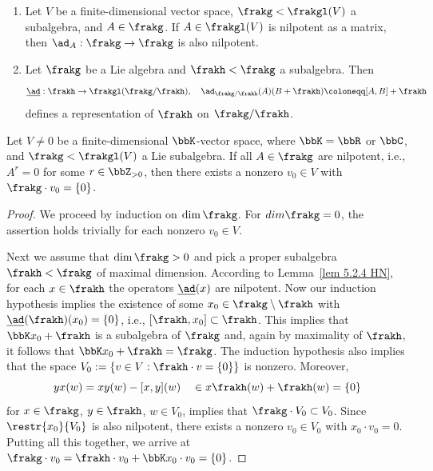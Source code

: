 \begin{lem}[{\cite[Lem.~5.2.4]{HN}}]\label{lem 5.2.4 HN}
    \begin{enumerate}[label=(\roman*)]
        \item Let $V$ be a finite-dimensional vector space, $\frakg<\frakgl(V)$ a subalgebra, and $A\in\frakg$. If $A\in\frakgl(V)$ is nilpotent as a matrix, then $\ad_A:\frakg\to\frakg$ is also nilpotent.
        \item Let $\frakg$ be a Lie algebra and $\frakh<\frakg$ a subalgebra. Then 
        \[\underline{\ad}:\frakh\to \frakgl(\frakg\slash\frakh),\quad \ad_{\frakg\slash\frakh}(A)(B+\frakh)\coloneqq [A,B]+\frakh\]
        defines a representation of $\frakh$ on $\frakg\slash\frakh$.
    \end{enumerate}
\end{lem}

\begin{thm}\label{thm 5.2.5 HN}
    Let $V\neq 0$ be a finite-dimensional $\bbK$-vector space, where $\bbK=\bbR$ or $\bbC$, and $\frakg<\frakgl(V)$ a Lie subalgebra. If all $A\in\frakg$ are nilpotent, i.e., $A^r=0$ for some $r\in\bbZ_{>0}$, then there exists a nonzero $v_0\in V$ with $\frakg\cdot v_0=\{0\}$.
\end{thm}
\begin{proof}
    We proceed by induction on $\dim \frakg$. For $dim \frakg = 0$, the assertion holds trivially for each nonzero $v_0 \in V$.

    Next we assume that $\dim \frakg > 0$ and pick a proper subalgebra $\frakh < \frakg$ of maximal dimension. According to Lemma~\ref{lem 5.2.4 HN}, for each $x \in \frakh$ the operators $\underline{\ad}(x)$ are nilpotent. Now our induction hypothesis implies the existence of some $x_0 \in \frakg\setminus\frakh$ with $\underline{\ad}(\frakh)(x_0) = \{0\}$, i.e., $[\frakh,x_0] \subset \frakh$. This implies that $\bbK x_0 + \frakh$ is a subalgebra of $\frakg$ and, again by maximality of $\frakh$, it follows that $\bbK x_0 + \frakh = \frakg$. The induction hypothesis also implies that the space $V_0 := \{v \in V : \frakh\cdot v = \{0\}\}$ is nonzero. Moreover,
    \[yx(w) = xy(w) - [x,y](w) \quad \in x\frakh(w) + \frakh(w) = \{0\}\]
    for $x \in \frakg$, $y \in \frakh$, $w \in V_0$, implies that $\frakg\cdot V_0 \subset V_0$. Since $\restr{x_0}{V_0}$ is also nilpotent, there exists a nonzero $v_0 \in V_0$ with $x_0\cdot v_0 = 0$. Putting all this together, we arrive at $\frakg\cdot v_0 = \frakh\cdot v_0 + \bbK x_0\cdot v_0 = \{0\}$.
\end{proof}

